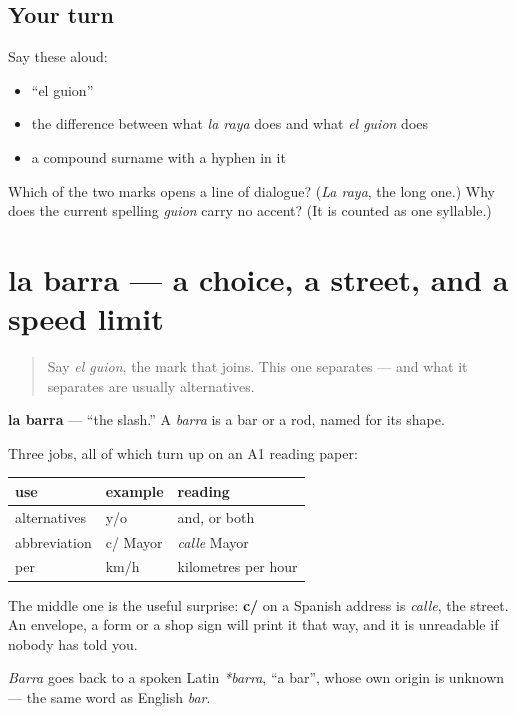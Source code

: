 \subsection*{Your turn}
Say these aloud:

\begin{itemize}
\raggedright
  \item \textquotedblleft{}el guion\textquotedblright{}
  \item the difference between what \emph{la raya} does and what \emph{el guion} does
  \item a compound surname with a hyphen in it
\end{itemize}

\begin{tcolorbox}[breakable,colback=teal!4,colframe=teal!35!black,title={Before you move on}]
Which of the two marks opens a line of dialogue? (\emph{La raya}, the long one.) Why does the current spelling \emph{guion} carry no accent? (It is counted as one syllable.)
\end{tcolorbox}
\section[la barra]{la barra — a choice, a street, and a speed limit}

\label{lesson:ES-C424-barra}



\begin{quote}
Say \emph{el guion}, the mark that joins. This one separates — and what it separates are usually alternatives.
\end{quote}

\begin{cousinweb}
\textbf{la barra} — \textquotedblleft{}the slash.\textquotedblright{} A \emph{barra} is a bar or a rod, named for its shape.

Three jobs, all of which turn up on an A1 reading paper:

\noindent
\begin{tabularx}{\linewidth}{@{}>{\raggedright\arraybackslash}X>{\raggedright\arraybackslash}X>{\raggedright\arraybackslash}X@{}}
\toprule
\textbf{use} & \textbf{example} & \textbf{reading} \\
\midrule
alternatives & y/o & and, or both \\
abbreviation & c/ Mayor & \emph{calle} Mayor \\
per & km/h & kilometres per hour \\
\bottomrule
\end{tabularx}

The middle one is the useful surprise: \textbf{c/} on a Spanish address is \emph{calle}, the street. An envelope, a form or a shop sign will print it that way, and it is unreadable if nobody has told you.

\emph{Barra} goes back to a spoken Latin \emph{*barra}, \textquotedblleft{}a bar\textquotedblright{}, whose own origin is unknown — the same word as English \emph{bar}.
\end{cousinweb}

